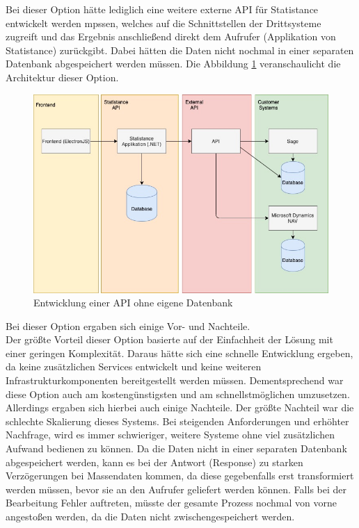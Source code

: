 Bei dieser Option hätte lediglich eine weitere externe API für Statistance entwickelt werden mpssen, welches auf die Schnittstellen der Drittsysteme zugreift und das Ergebnis anschließend direkt dem Aufrufer (Applikation von Statistance) zurückgibt. Dabei hätten die Daten nicht nochmal in einer separaten Datenbank abgespeichert werden müssen. Die Abbildung \ref{fig:Entwicklung einer API ohne eigene Datenbank} veranschaulicht die Architektur dieser Option.

\begin{figure}[!h]
\centering
\includegraphics[width=15cm]{images/0x_implementation_possibilities/opt1.jpg}
\caption{Entwicklung einer API ohne eigene Datenbank}
\label{fig:Entwicklung einer API ohne eigene Datenbank}
\end{figure}

Bei dieser Option ergaben sich einige Vor- und Nachteile.\\
Der größte Vorteil dieser Option basierte auf der Einfachheit der Lösung mit einer geringen Komplexität. Daraus hätte sich eine schnelle Entwicklung ergeben, da keine zusätzlichen Services entwickelt und keine weiteren Infrastrukturkomponenten bereitgestellt werden müssen. Dementsprechend war diese Option auch am kostengünstigsten und am schnellstmöglichen umzusetzen. Allerdings ergaben sich hierbei auch einige Nachteile. Der größte Nachteil war die schlechte Skalierung dieses Systems. Bei steigenden Anforderungen und erhöhter Nachfrage, wird es immer schwieriger, weitere Systeme ohne viel zusätzlichen Aufwand bedienen zu können. Da die Daten nicht in einer separaten Datenbank abgespeichert werden, kann es bei der Antwort (Response) zu starken Verzögerungen bei Massendaten kommen, da diese gegebenfalls erst transformiert werden müssen, bevor sie an den Aufrufer geliefert werden können. Falls bei der Bearbeitung Fehler auftreten, müsste der gesamte Prozess nochmal von vorne angestoßen werden, da die Daten nicht zwischengespeichert werden. 